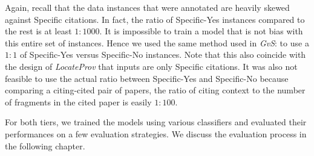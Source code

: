 Again, recall that the data instances that were annotated are heavily skewed against Specific citations. In fact, the ratio of Specific-Yes instances compared to the rest is at least $1:1000$. It is impossible to train a model that is not bias with this entire set of instances. Hence we used the same method used in {\it GvS}: to use a $1:1$ of Specific-Yes versus Specific-No instances. Note that this also coincide with the design of {\it LocateProv} that inputs are only Specific citations. It was also not feasible to use the actual ratio between Specific-Yes and Specific-No because comparing a citing-cited pair of papers, the ratio of citing context to the number of fragments in the cited paper is easily $1:100$.

For both tiers, we trained the models using various classifiers and evaluated their performances on a few evaluation strategies. We discuss the evaluation process in the following chapter.